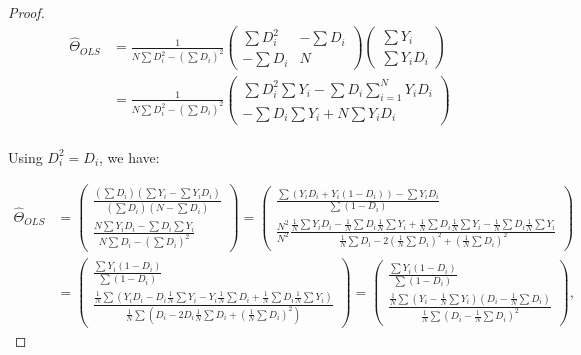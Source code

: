 \documentclass[
]{book}
\theoremstyle{definition}
\theoremstyle{definition}
\theoremstyle{definition}
\theoremstyle{definition}
\theoremstyle{remark}
\begin{document}
\begin{proof}
\begin{align*}
  \hat{\Theta}_{OLS} &  = \frac{1}{N\sum D_i^2-\left(\sum D_i\right)^2}
                          \left(\begin{array}{cc} \sum D_i^2 & -\sum D_i \\ -\sum D_i & N \end{array}\right)
                          \left(\begin{array}{c} \sum Y_i \\  \sum Y_iD_i \end{array}\right) \\
                    & = \frac{1}{N\sum D_i^2-\left(\sum D_i\right)^2}
                        \left(\begin{array}{c} \sum D_i^2\sum Y_i-\sum D_i\sum_{i=1}^NY_iD_i \\
                                              -\sum D_i\sum Y_i+ N\sum Y_iD_i \end{array}\right) \\
\end{align*}

Using \(D_i^2=D_i\), we have:

\begin{align*}
  \hat{\Theta}_{OLS} &  =  \left(\begin{array}{c} 
          \frac{\left(\sum D_i\right)\left(\sum Y_i-\sum Y_iD_i\right)}{\left(\sum D_i\right)\left(N-\sum D_i\right)} \\
          \frac{N\sum Y_iD_i-\sum D_i\sum Y_i}{N\sum D_i-\left(\sum D_i\right)^2} 
                            \end{array}\right) 
                        =     \left(\begin{array}{c} 
          \frac{\sum (Y_iD_i+Y_i(1-D_i))-\sum Y_iD_i}{\sum(1-D_i)} \\
          \frac{N^2}{N^2}\frac{\frac{1}{N}\sum Y_iD_i-\frac{1}{N}\sum D_i\frac{1}{N}\sum Y_i+\frac{1}{N}\sum D_i\frac{1}{N}\sum Y_i-\frac{1}{N}\sum D_i\frac{1}{N}\sum Y_i}{\frac{1}{N}\sum D_i-2\left(\frac{1}{N}\sum D_i\right)^2+\left(\frac{1}{N}\sum D_i\right)^2} 
                            \end{array}\right) \\
                      &  =     \left(\begin{array}{c} 
          \frac{\sum Y_i(1-D_i)}{\sum(1-D_i)} \\
          \frac{\frac{1}{N}\sum \left(Y_iD_i-D_i\frac{1}{N}\sum Y_i-Y_i\frac{1}{N}\sum D_i+\frac{1}{N}\sum D_i\frac{1}{N}\sum Y_i\right)}{\frac{1}{N}\sum\left(D_i-2D_i\frac{1}{N}\sum D_i+\left(\frac{1}{N}\sum D_i\right)^2\right)} 
                            \end{array}\right) 
                      =     \left(\begin{array}{c} 
          \frac{\sum Y_i(1-D_i)}{\sum(1-D_i)} \\
    \frac{\frac{1}{N}\sum\left(Y_i-\frac{1}{N}\sum Y_i\right)\left(D_i-\frac{1}{N}\sum D_i\right)}{\frac{1}{N}\sum \left(D_i-\frac{1}{N}\sum D_i\right)^2} 
                            \end{array}\right), 
\end{align*}


\end{proof}
\end{document}
